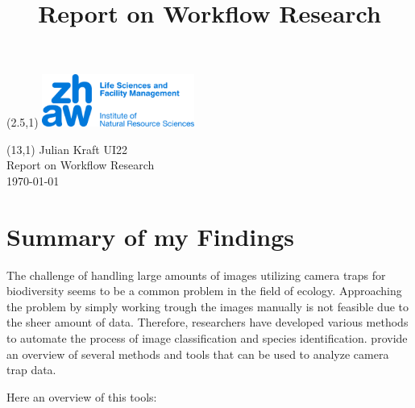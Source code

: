 \documentclass{article}
\title{Report on Workflow Research}
\makeatletter
\renewcommand{\maketitle}{
  \begin{flushleft} 
    \Large\textmd{\@title} 
    \par
  \end{flushleft}
}
\makeatother
\begin{document}
\begin{textblock}{5}(2.5,1) %
  \includegraphics[width=5cm]{logo.jpg} %
\end{textblock}

\begin{textblock}{6}(13,1) %
        \raggedleft
        Julian Kraft UI22\\
        Report on Workflow Research\\
        \today
\end{textblock}

\vspace*{1.5cm}


\maketitle


\section*{Summary of my Findings}

The challenge of handling large amounts of images utilizing camera traps for biodiversity seems to be a common problem in the field of ecology.
Approaching the problem by simply working trough the images manually is not feasible due to the sheer amount of data.
Therefore, researchers have developed various methods to automate the process of image classification and species identification.
\textcite{velezChoosingAppropriatePlatform2022} provide an overview of several methods and tools that can be used to analyze camera trap data.

Here an overview of this tools:
\end{document}
